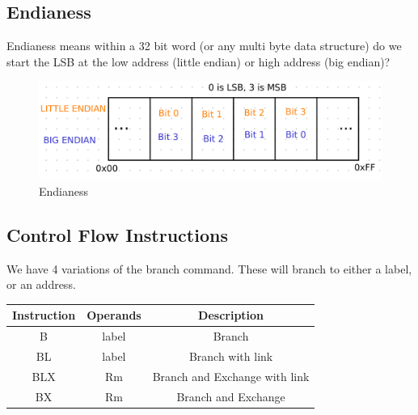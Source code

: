 \documentclass[12pt,letterpaper]{article} \usepackage{amsmath} \usepackage{graphicx} \usepackage[margin=1in]{geometry} \usepackage{longtable}  \usepackage{amssymb}
\begin{document}
	\subsection{Endianess}
	Endianess means within a 32 bit word (or any multi byte data structure) do we start the LSB at the low address (little endian) or high address (big endian)?
	
	\begin{figure}[h!]
		\centering
		\includegraphics[width=0.5\linewidth]{images/endian}
		\caption{Endianess}
		\label{fig:endian}
	\end{figure}
	
	\subsection{Control Flow Instructions}
	We have 4 variations of the branch command. These will branch to either a label, or an address. 
	\begin{center}
		\begin{tabular}{|c|c|c|}
			\hline
			Instruction & Operands & Description \\
			\hline\hline
			B & label & Branch \\
			\hline
			BL & label & Branch with link \\
			\hline
			BLX & Rm & Branch and Exchange with link \\
			\hline
			BX & Rm & Branch and Exchange \\
			\hline
		\end{tabular}
	\end{center}
	
\end{document}
